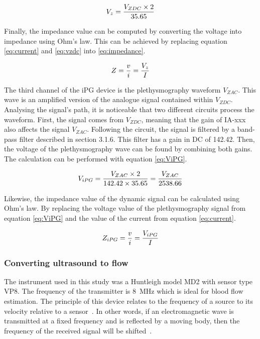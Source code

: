 
\begin{align}
	\label{eq:vzdc}
	V_z = \frac{V_{ZDC} \times 2}{35.65} \tagaddtext{[\si{\volt}]}
\end{align}

Finally, the impedance value can be computed by converting the voltage into impedance using Ohm's law. This can be achieved by replacing equation \ref{eq:current} and \ref{eq:vzdc} into \ref{eq:impedance}.

\begin{align}
	\label{eq:impedance}
	Z = \frac{v}{i}=\frac{V_z}{I} \tagaddtext{[\si{\ohm}]}
\end{align}

The third channel of the iPG device is the plethysmography waveform $V_{ZAC}$. This wave is an amplified version of the analogue signal contained within $V_{ZDC}$. Analysing the signal's path, it is noticeable that two different circuits process the waveform. First, the signal comes from $V_{ZDC}$, meaning that the gain of IA-xxx also affects the signal $V_{ZAC}$. Following the circuit, the signal is filtered by a band-pass filter described in section 3.1.6. This filter has a gain in DC of 142.42. Then, the voltage of the plethysmography wave can be found by combining both gains. The calculation can be performed with equation \ref{eq:ViPG}.

\begin{align}
	\label{eq:ViPG}
	V_{iPG} = \frac{V_{ZAC} \times 2}{142.42 \times 35.65}=\frac{V_{ZAC}}{2538.66} \tagaddtext{[\si{\volt}]}
\end{align}


Likewise, the impedance value of the dynamic signal can be calculated using Ohm's law. By replacing the voltage value of the plethysmography signal from equation \ref{eq:ViPG} and the value of the current from equation \ref{eq:current}.

\begin{align}
	\label{eq:zipg}
	Z_{iPG}=\frac{v}{i} = \frac{V_{iPG}}{I} \tagaddtext{[\si{\ohm}]}
\end{align}

\subsubsection{Converting ultrasound to flow}
\label{sectionDU}
The instrument used in this study was a Huntleigh model MD2 with sensor type VP8. The frequency of the transmitter is \SI{8}{\mega\hertz} which is ideal for blood flow estimation. The principle of this device relates to the frequency of a source to its velocity relative to a sensor~\cite{surgeonhand2002Hand}.  In other words, if an electromagnetic wave is transmitted at a fixed frequency and is reflected by a moving body, then the frequency of the received signal will be shifted~\cite{ht:MD2}.  

